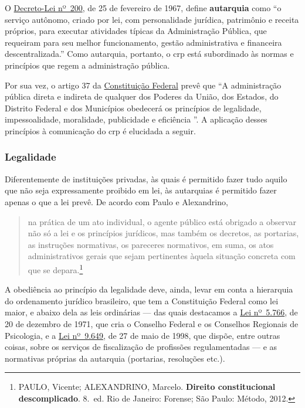 O \href{https://www.planalto.gov.br/ccivil_03/decreto-lei/del0200.htm}{Decreto-Lei nº~200}, de 25 de fevereiro de 1967, define \textbf{autarquia} como ``o serviço autônomo, criado por lei, com personalidade jurídica, patrimônio e receita próprios, para executar atividades típicas da Administração Pública, que requeiram para seu melhor funcionamento, gestão administrativa e financeira descentralizada.'' Como autarquia, portanto, o \ac{crp} está subordinado às normas e princípios que regem a administração pública.

Por sua vez, o artigo 37 da \href{https://www.planalto.gov.br/ccivil_03/constituicao/constituicao.htm}{Constituição Federal} prevê que ``A administração pública direta e indireta de qualquer dos Poderes da União, dos Estados, do Distrito Federal e dos Municípios obedecerá os princípios de legalidade, impessoalidade, moralidade, publicidade e eficiência \xelip''. A aplicação desses princípios à comunicação do \ac{crp} é elucidada a seguir.

\subsubsection{Legalidade}

Diferentemente de instituições privadas, às quais é permitido fazer tudo aquilo que não seja expressamente proibido em lei, às autarquias é permitido fazer apenas o que a lei prevê. De acordo com Paulo e Alexandrino,

\begin{quote}
\xelip na prática de um ato individual, o agente público está obrigado a observar não só a lei e os princípios jurídicos, mas também os decretos, as portarias, as instruções normativas, os pareceres normativos, em suma, os atos administrativos gerais que sejam pertinentes àquela situação concreta com que \xelip se depara.\footnote{PAULO, Vicente; ALEXANDRINO, Marcelo. \textbf{Direito constitucional descomplicado}. 8.~ed. Rio de Janeiro: Forense; São Paulo: Método, 2012.}
\end{quote}

A obediência ao princípio da legalidade deve, ainda, levar em conta a hierarquia do ordenamento jurídico brasileiro, que tem a Constituição Federal como lei maior, e abaixo dela as leis ordinárias --- das quais destacamos a \href{https://transparencia.cfp.org.br/wp-content/uploads/2008/08/lei_1971_57661.pdf}{Lei nº~5.766}, de 20 de dezembro de 1971, que cria o Conselho Federal e os Conselhos Regionais de Psicologia, e a \href{https://transparencia.cfp.org.br/wp-content/uploads/2008/08/lei_1998_96491.pdf}{Lei nº~9.649}, de 27 de maio de 1998, que dispõe, entre outras coisas, sobre os serviços de fiscalização de profissões regulamentadas --- e as normativas próprias da autarquia (portarias, resoluções etc.).

